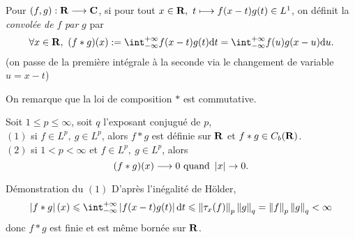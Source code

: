 \documentclass[a4paper,11pt, twoside]{article}
\begin{document}




\begin{Def}
  Pour $(f,g):\mathbf R\longrightarrow\mathbf C$, si pour tout $x\in \mathbf R,\ t\longmapsto f(x-t)g(t)\in L^1$, on définit la \emph{convolée de }$f$\emph{ par }$g$ par 
  $$\forall x\in\R,\ (f*g)(x):=\int_{-\infty}^{+\infty}f(x-t)g(t)\dt=\int_{-\infty}^{+\infty}f(u)g(x-u)\mathrm du.$$
  (on passe de la première intégrale à la seconde via le changement de variable $u=x-t$)
\end{Def}


\begin{RQ}
  On remarque que la loi de composition $*$ est commutative.
\end{RQ}


\begin{Th}
  Soit $1\leqslant p\leqslant \infty$, soit $q$ l'exposant conjugué de $p$,\\

  $(\mathit 1)$ si $f\in L^p,\ g\in L^p$, alors $f*g$ est définie sur $\mathbf R$ et $f*g\in C_b(\mathbf R)$.\\
  $(\mathit 2)$ si $1<p< \infty$ et $f\in L^p,\ g\in L^p$, alors 
  $$(f*g)(x)\longrightarrow 0\text{ quand }\left| x\right|\to 0.$$ 
\end{Th}


\begin{ProofC}{Démonstration du $(\mathit 1)$}
  D'après l'inégalité de Hölder, 
  $$\abs{f*g}(x)\leqslant\intr\abs{f(x-t)g(t)}\dt\leqslant\norm{\tau_x(f)}_p\norm{g}_q=\norm{f}_p\norm{g}_q<\infty$$
  donc $f*g$ est finie et est même bornée sur $\mathbf R$.
\end{ProofC}
\end{document}
